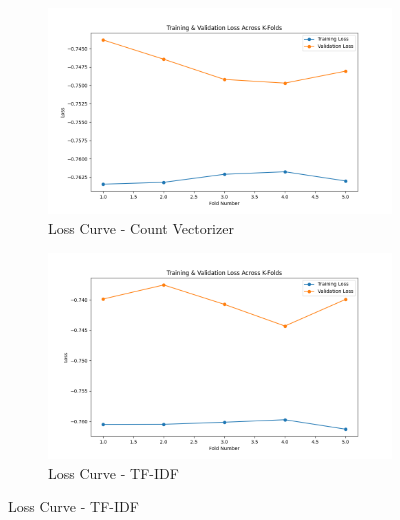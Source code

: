 \begin{figure}[H]
    \centering
    \begin{subfigure}[b]{0.48\textwidth}
        \includegraphics[width=\textwidth]{img/report_info/img/1.1.LogisticRegression/best_logistic_regression_count_loss.png}
        \caption{Loss Curve - Count Vectorizer}
        \label{fig:lr-count-loss}
    \end{subfigure}
    \begin{subfigure}[b]{0.48\textwidth}
        \includegraphics[width=\textwidth]{img/report_info/img/1.1.LogisticRegression/best_logistic_regression_tfidf_loss.png}
        \caption{Loss Curve - TF-IDF}
        \label{fig:lr-tfidf-loss}
    \end{subfigure}
    

\end{figure}
